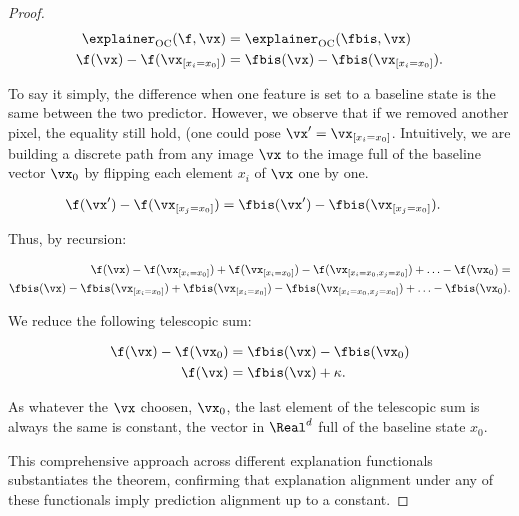 \begin{proof}
\begin{align}
\explainer_{\text{OC}}(\f, \vx) &= \explainer_{\text{OC}}(\fbis, \vx) \\
\f(\vx) - \f(\vx_{[x_i = x_0]}) &= \fbis(\vx) - \fbis(\vx_{[x_i = x_0]}).
\end{align}

To say it simply, the difference when one feature is set to a baseline state is the same between the two predictor. However, we observe that if we removed another pixel, the equality still hold, (one could pose $\vx' = \vx_{[x_i = x_0]}$. Intuitively, we are building a discrete path from any image $\vx$ to the image full of the baseline vector $\vx_0$ by flipping each element $x_i$ of $\vx$ one by one.

\begin{align}
\f(\vx') - \f(\vx_{[x_j = x_0]}) &= \fbis(\vx') - \fbis(\vx_{[x_j = x_0]}).
\end{align}

Thus, by recursion:

\begin{align}
\f(\vx) - \f(\vx_{[x_i = x_0]}) + \f(\vx_{[x_i = x_0]}) - \f(\vx_{[x_i = x_0, x_j = x_0]}) + \ldots - \f(\vx_0)  = \\ \fbis(\vx) - \fbis(\vx_{[x_i = x_0]}) + \fbis(\vx_{[x_i = x_0]}) - \fbis(\vx_{[x_i = x_0, x_j = x_0]}) + \ldots - \fbis(\vx_0).
\end{align}

We reduce the following telescopic sum:

\begin{align}
\f(\vx) - \f(\vx_0)  &= \fbis(\vx) - \fbis(\vx_0) \\
\f(\vx) &= \fbis(\vx) + \kappa.
\end{align}

As whatever the $\vx$ choosen, $\vx_0$, the last element of the telescopic sum is always the same is constant, the vector in $\Real^d$ full of the baseline state $x_0$. 

This comprehensive approach across different explanation functionals substantiates the theorem, confirming that explanation alignment under any of these functionals imply prediction alignment up to a constant.

\end{proof}
